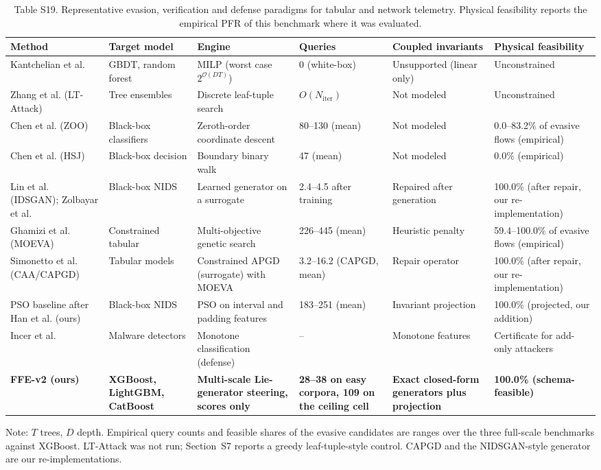 \begin{table}[!htbp]
\caption*{Table S19. Representative evasion, verification and defense paradigms for tabular and network telemetry. Physical feasibility reports the empirical PFR of this benchmark where it was evaluated.}
\centering
\linespread{1}\selectfont
\footnotesize
\setlength{\tabcolsep}{4pt}
\begin{tabular}{@{}p{2.0cm}p{1.6cm}p{2.4cm}p{1.9cm}p{2.1cm}p{2.1cm}@{}}
\toprule
\textbf{Method} & \textbf{Target model} & \textbf{Engine} & \textbf{Queries} & \textbf{Coupled invariants} & \textbf{Physical feasibility} \\
\midrule
Kantchelian et al. & GBDT, random forest & MILP (worst case $2^{\mathcal{O}(DT)}$) & 0 (white-box) & Unsupported (linear only) & Unconstrained \\
Zhang et al. (LT-Attack) & Tree ensembles & Discrete leaf-tuple search & $O(N_{\text{iter}})$ & Not modeled & Unconstrained \\
Chen et al. (ZOO) & Black-box classifiers & Zeroth-order coordinate descent & 80--130 (mean) & Not modeled & 0.0--83.2\% of evasive flows (empirical) \\
Chen et al. (HSJ) & Black-box decision & Boundary binary walk & 47 (mean) & Not modeled & 0.0\% (empirical) \\
Lin et al. (IDSGAN); Zolbayar et al. & Black-box NIDS & Learned generator on a surrogate & 2.4--4.5 after training & Repaired after generation & 100.0\% (after repair, our re-implementation) \\
Ghamizi et al. (MOEVA) & Constrained tabular & Multi-objective genetic search & 226--445 (mean) & Heuristic penalty & 59.4--100.0\% of evasive flows (empirical) \\
Simonetto et al. (CAA/CAPGD) & Tabular models & Constrained APGD (surrogate) with MOEVA & 3.2--16.2 (CAPGD, mean) & Repair operator & 100.0\% (after repair, our re-implementation) \\
PSO baseline after Han et al. (ours) & Black-box NIDS & PSO on interval and padding features & 183--251 (mean) & Invariant projection & 100.0\% (projected, our addition) \\
Incer et al. & Malware detectors & Monotone classification (defense) & -- & Monotone features & Certificate for add-only attackers \\
\midrule
\textbf{FFE-v2 (ours)} & \textbf{XGBoost, LightGBM, CatBoost} & \textbf{Multi-scale Lie-generator steering, scores only} & \textbf{28--38 on easy corpora, 109 on the ceiling cell} & \textbf{Exact closed-form generators plus projection} & \textbf{100.0\% (schema-feasible)} \\
\bottomrule
\end{tabular}

\smallskip
\footnotesize{Note: $T$ trees, $D$ depth. Empirical query counts and feasible shares of the evasive candidates are ranges over the three full-scale benchmarks against XGBoost. LT-Attack was not run; Section~S7 reports a greedy leaf-tuple-style control. CAPGD and the NIDSGAN-style generator are our re-implementations.}
\end{table}
